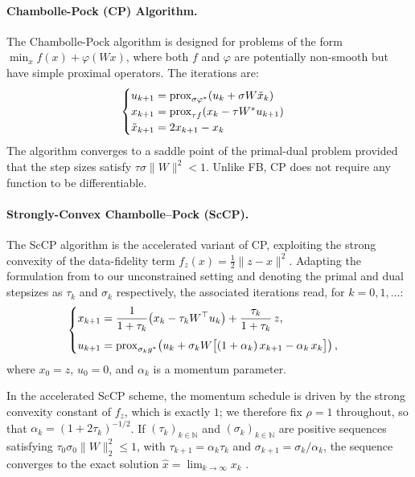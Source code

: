 \documentclass[a4paper,11pt]{article}
\renewcommand{\leq}{\ensuremath{\leqslant}}
\newcommand{\prox}{\ensuremath{\text{\rm prox}}}
\theoremstyle{plain}{\theorembodyfont{\rmfamily}%
\newtheorem{proposition}[theorem]{Proposition}}
\theoremstyle{plain}{\theorembodyfont{\rmfamily}%
\newtheorem{notation}[theorem]{Notation}}
\theoremstyle{plain}{\theorembodyfont{\rmfamily}%
\newtheorem{assumption}[theorem]{Assumption}}
\theoremstyle{plain}{\theorembodyfont{\rmfamily}%
\newtheorem{problem}[theorem]{Problem}}
\theoremstyle{plain}{\theorembodyfont{\rmfamily}%
\newtheorem{example}[theorem]{Example}}
\theoremstyle{plain}{\theorembodyfont{\rmfamily}%
\newtheorem{remark}[theorem]{Remark}}
\theoremstyle{plain}{\theorembodyfont{\rmfamily}%
\newtheorem{definition}[theorem]{Definition}}
\theoremstyle{plain}{\theorembodyfont{\rmfamily}%
\newtheorem{question}[theorem]{Question}}
\numberwithin{equation}{section}
\begin{document}
\paragraph{Chambolle-Pock (CP) Algorithm.}
The Chambolle-Pock algorithm \cite{chambolle2011first} is designed for problems of the form $\min_x f(x) + \varphi(Wx)$, where both $f$ and $\varphi$ are potentially non-smooth but have simple proximal operators. The iterations are:
\begin{equation}
    \begin{cases}
    u_{k+1} = \prox_{\sigma \varphi^*} (u_k + \sigma W \tilde{x}_k) \\
    x_{k+1} = \prox_{\tau f} (x_k - \tau W^* u_{k+1}) \\
    \tilde{x}_{k+1} = 2x_{k+1} - x_k
    \end{cases}
\end{equation}
The algorithm converges to a saddle point of the primal-dual problem provided that the step sizes satisfy $\tau \sigma \|W\|^2 < 1$. Unlike FB, CP does not require any function to be differentiable.

\paragraph{Strongly-Convex Chambolle--Pock (ScCP).}
The ScCP algorithm \cite{chambolle2011first} is the accelerated variant of CP, exploiting the strong convexity of the data-fidelity term $f_z(x) = \frac{1}{2}\|z - x\|^2$.
Adapting the formulation from \cite{le2024unfolded} to our unconstrained setting and denoting the primal and dual stepsizes as $\tau_k$ and $\sigma_k$ respectively, the associated iterations read, for $k = 0, 1, \ldots$:
\begin{equation}
\label{eq:sccp}
    \begin{cases}
        \displaystyle
        x_{k+1} = \frac{1}{1+\tau_k}\bigl(x_k - \tau_k W^\top u_k\bigr) + \frac{\tau_k}{1+\tau_k}\, z, \\[10pt]
        \displaystyle
        u_{k+1} = \prox_{\sigma_k g^*}\!\left(
            u_k + \sigma_k W\bigl[(1+\alpha_k)\,x_{k+1} - \alpha_k\, x_k\bigr]
        \right),
    \end{cases}
\end{equation}
where $x_0 = z$, $u_0 = 0$, and $\alpha_k$ is a momentum parameter.

In the accelerated ScCP scheme, the momentum schedule is driven by the strong convexity constant of $f_z$, which is exactly $1$; we therefore fix $\rho = 1$ throughout, so that $\alpha_k = (1 + 2\tau_k)^{-1/2}$. If $(\tau_k)_{k\in\mathbb{N}}$ and $(\sigma_k)_{k\in\mathbb{N}}$ are positive sequences satisfying $\tau_0\sigma_0\|W\|_2^2 \leq 1$, with $\tau_{k+1} = \alpha_k\tau_k$ and $\sigma_{k+1} = \sigma_k/\alpha_k$, the sequence converges to the exact solution $\hat{x} = \lim_{k\to\infty} x_k$ \cite{chambolle2011first}.
\end{document}
